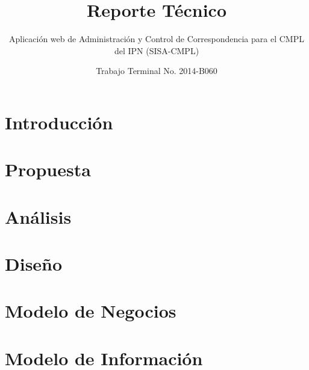 \documentclass[oneside,10pt]{book}
\title{Reporte Técnico}
\subtitle{Aplicación web de Administración y Control de Correspondencia para el CMPL del IPN (SISA-CMPL)}
\author{Trabajo Terminal No. 2014-B060}
\begin{document}
\maketitle
\thispagestyle{empty}

\frontmatter
\tableofcontents

\mainmatter

\chapter{Introducción}



\chapter{Propuesta}


\chapter{Análisis}


\chapter{Diseño}



\chapter{Modelo de Negocios}




\chapter{Modelo de Información}

\end{document}

